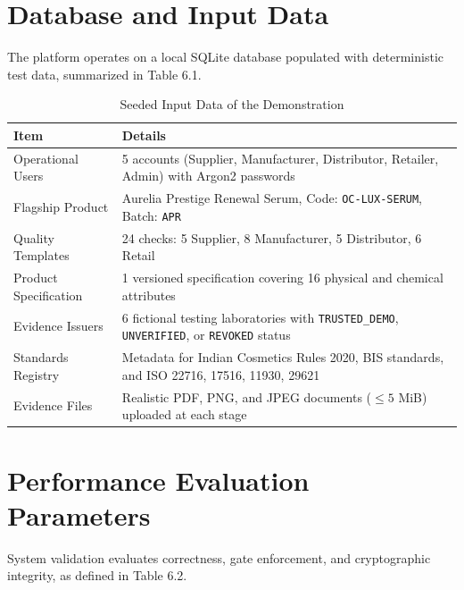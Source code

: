 \documentclass[12pt,a4paper]{report}
\begin{document}
\section{Database and Input Data}
The platform operates on a local SQLite database populated with deterministic test data, summarized in Table 6.1.

\begin{table}[H]
\centering
\caption{Seeded Input Data of the Demonstration}
\label{tab:seed_data}
\small
\renewcommand{\arraystretch}{1.22}
\begin{tabularx}{\textwidth}{L{4.2cm} Y}
\toprule
\textbf{Item} & \textbf{Details} \\
\midrule
Operational Users & 5 accounts (Supplier, Manufacturer, Distributor, Retailer, Admin) with Argon2 passwords \\
Flagship Product & Aurelia Prestige Renewal Serum, Code: \texttt{OC\allowbreak-LUX\allowbreak-SERUM}, Batch: \texttt{APR} \\
Quality Templates & 24 checks: 5 Supplier, 8 Manufacturer, 5 Distributor, 6 Retail \\
Product Specification & 1 versioned specification covering 16 physical and chemical attributes \\
Evidence Issuers & 6 fictional testing laboratories with \texttt{TRUSTED\_DEMO}, \texttt{UNVERIFIED}, or \texttt{REVOKED} status \\
Standards Registry & Metadata for Indian Cosmetics Rules 2020, BIS standards, and ISO 22716, 17516, 11930, 29621 \\
Evidence Files & Realistic PDF, PNG, and JPEG documents ($\le 5$ MiB) uploaded at each stage \\
\bottomrule
\end{tabularx}
\end{table}

\section{Performance Evaluation Parameters}
System validation evaluates correctness, gate enforcement, and cryptographic integrity, as defined in Table 6.2.
\end{document}

